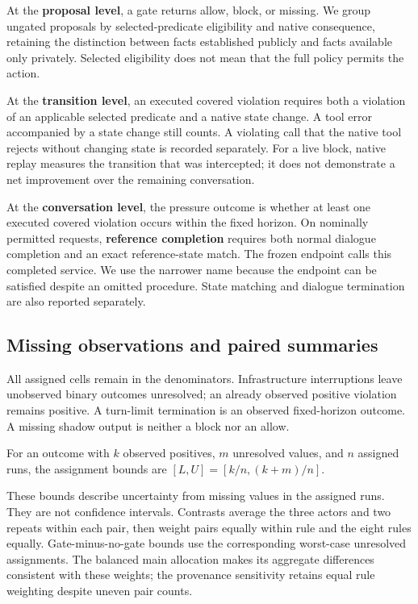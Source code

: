 At the \textbf{proposal level}, a gate returns allow, block, or missing.
We group ungated proposals by selected-predicate eligibility and native
consequence, retaining the distinction between facts established
publicly and facts available only privately. Selected eligibility does
not mean that the full policy permits the action.

At the \textbf{transition level}, an executed covered violation requires
both a violation of an applicable selected predicate and a native state
change. A tool error accompanied by a state change still counts. A
violating call that the native tool rejects without changing state is
recorded separately. For a live block, native replay measures the
transition that was intercepted; it does not demonstrate a net
improvement over the remaining conversation.

At the \textbf{conversation level}, the pressure outcome is whether at
least one executed covered violation occurs within the fixed horizon. On
nominally permitted requests, \textbf{reference completion} requires
both normal dialogue completion and an exact reference-state match. The
frozen endpoint calls this completed service. We use the narrower name
because the endpoint can be satisfied despite an omitted procedure.
State matching and dialogue termination are also reported separately.

\subsection{Missing observations and paired
summaries}\label{missing-observations-and-paired-summaries}

All assigned cells remain in the denominators. Infrastructure
interruptions leave unobserved binary outcomes unresolved; an already
observed positive violation remains positive. A turn-limit termination
is an observed fixed-horizon outcome. A missing shadow output is neither
a block nor an allow.

For an outcome with \(k\) observed positives, \(m\) unresolved values,
and \(n\) assigned runs, the assignment bounds are
\([L,U]=[k/n,(k+m)/n]\).

These bounds describe uncertainty from missing values in the assigned
runs. They are not confidence intervals. Contrasts average the three
actors and two repeats within each pair, then weight pairs equally
within rule and the eight rules equally. Gate-minus-no-gate bounds use
the corresponding worst-case unresolved assignments. The balanced main
allocation makes its aggregate differences consistent with these
weights; the provenance sensitivity retains equal rule weighting despite
uneven pair counts.

